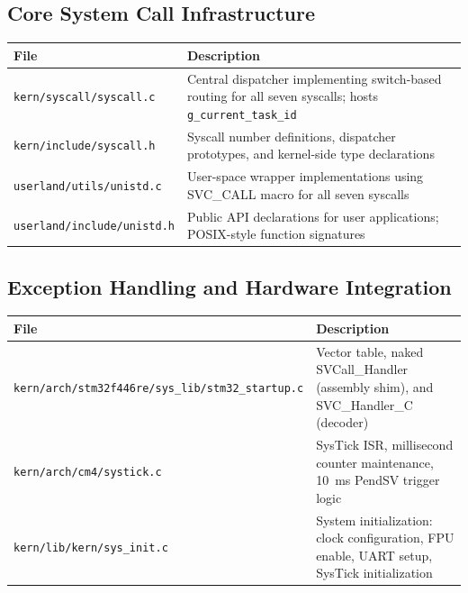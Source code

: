\documentclass[11pt,a4paper]{article}
\newcommand{\file}[1]{\texttt{#1}}
\begin{document}
\subsection{Core System Call Infrastructure}
\begin{table}[h]
\centering
\begin{tabularx}{\linewidth}{@{}l X@{}}
\toprule
\textbf{File} & \textbf{Description} \\
\midrule
\file{kern/syscall/syscall.c} & Central dispatcher implementing switch-based routing for all seven syscalls; hosts \texttt{g\_current\_task\_id} \\[0.2cm]
\file{kern/include/syscall.h} & Syscall number definitions, dispatcher prototypes, and kernel-side type declarations \\[0.2cm]
\file{userland/utils/unistd.c} & User-space wrapper implementations using SVC\_CALL macro for all seven syscalls \\[0.2cm]
\file{userland/include/unistd.h} & Public API declarations for user applications; POSIX-style function signatures \\
\bottomrule
\end{tabularx}
\end{table}

\subsection{Exception Handling and Hardware Integration}
\begin{table}[h]
\centering
\begin{tabularx}{\linewidth}{@{}l X@{}}
\toprule
\textbf{File} & \textbf{Description} \\
\midrule
\file{kern/arch/stm32f446re/sys\_lib/stm32\_startup.c} & Vector table, naked SVCall\_Handler (assembly shim), and SVC\_Handler\_C (decoder) \\[0.2cm]
\file{kern/arch/cm4/systick.c} & SysTick ISR, millisecond counter maintenance, 10~ms PendSV trigger logic \\[0.2cm]
\file{kern/lib/kern/sys\_init.c} & System initialization: clock configuration, FPU enable, UART setup, SysTick initialization \\
\bottomrule
\end{tabularx}
\end{table}
\end{document}
